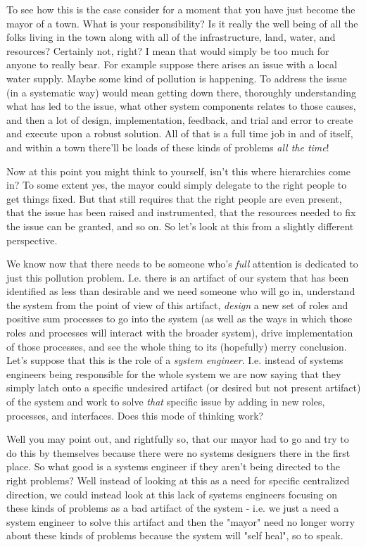 \documentclass[11pt,a5paper]{book}
\begin{document}
To see how this is the case consider for a moment that you have just become the mayor of a town. What is your responsibility? Is it really the well being of all the folks living in the town along with all of the infrastructure, land, water, and resources? Certainly not, right? I mean that would simply be too much for anyone to really bear. For example suppose there arises an issue with a local water supply. Maybe some kind of pollution is happening. To address the issue (in a systematic way) would mean getting down there, thoroughly understanding what has led to the issue, what other system components relates to those causes, and then a lot of design, implementation, feedback, and trial and error to create and execute upon a robust solution. All of that is a full time job in and of itself, and within a town there'll be loads of these kinds of problems \textit{all the time}!
\newline

Now at this point you might think to yourself, isn't this where hierarchies come in? To some extent yes, the mayor could simply delegate to the right people to get things fixed. But that still requires that the right people are even present, that the issue has been raised and instrumented, that the resources needed to fix the issue can be granted, and so on. So let's look at this from a slightly different perspective. 
\newline

We know now that there needs to be someone who's \textit{full} attention is dedicated to just this pollution problem. I.e. there is an artifact of our system that has been identified as less than desirable and we need someone who will go in, understand the system from the point of view of this artifact, \textit{design} a new set of roles and positive sum processes to go into the system (as well as the ways in which those roles and processes will interact with the broader system), drive implementation of those processes, and see the whole thing to its (hopefully) merry conclusion. Let's suppose that this is the role of a \textit{system engineer}. I.e. instead of systems engineers being responsible for the whole system we are now saying that they simply latch onto a specific undesired artifact (or desired but not present artifact) of the system and work to solve \textit{that} specific issue by adding in new roles, processes, and interfaces. Does this mode of thinking work?
\newline

Well you may point out, and rightfully so, that our mayor had to go and try to do this by themselves because there were no systems designers there in the first place. So what good is a systems engineer if they aren't being directed to the right problems? Well instead of looking at this as a need for specific centralized direction, we could instead look at this lack of systems engineers focusing on these kinds of problems as a bad artifact of the system - i.e. we just a need a system engineer to solve this artifact and then the "mayor" need no longer worry about these kinds of problems because the system will "self heal", so to speak. 
\newline
\end{document}
